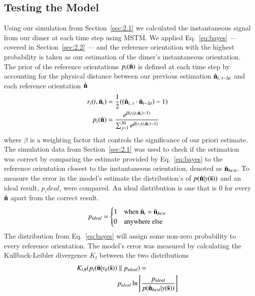 \documentclass[final, 3p]{elsarticle}
\begin{document}
\subsection{Testing the Model}
\label{sec:2.3}


Using our simulation from Section~\ref{sec:2.1} we calculated the
instantaneous signal from our dimer at each time step using MSTM.  We
applied Eq.~\eqref{eq:bayes} --- covered in Section~\ref{sec:2.2} ---
and the reference orientation with the highest probability is taken as
our estimation of the dimer's instantaneous orientation.  The prior of
the reference orientations $p_i(\hat{\bf n})$ is defined at each time
step by accounting for the physical distance between our previous
estimation $\hat{\bf n}_{i, \ t - \Delta t}$ and each reference
orientation $\hat{\bf n}$
\begin{align}
  r_i(t, \hat{\bf n}_i)
  &= \frac{1}{2}((\hat{\bf n}_{i,\ t} \cdot \hat{\bf n}_{t-\Delta t})-1)
  \\
  p_i(\hat{\bf n})
  &= \frac{e^{\beta (r_i(t,\hat{\bf n}_i)-1)}}
{\sum_{j=1}^{30}e^{\beta(r_j(t, \hat{\bf n}_i)-1)}}
\end{align}
where $\beta$ is a weighting factor that controls the significance of
our priori estimate.  The simulation data from Section~\ref{sec:2.1}
was used to check if the estimation was correct by comparing the
estimate provided by Eq.~\eqref{eq:bayes} to the reference orientation
closest to the instantaneous orientation, denoted as
$\hat{\bf n}_{best}$.  To measure the error in the model's estimate
the distribution's of $p(\hat{\bf n}| y(\bar{\bf s}))$ and an
ideal result, $p_ideal$, were compared.  An ideal distribution is one
that is 0 for every $\hat{\bf n}$ apart from the correct result.
\begin{align}
p_{ideal} = 
\begin{cases}
	1 & \text{when $\hat{\bf n}_i$ = $\hat{\bf n}_{best}$}\\
	0 & \text{anywhere else}
\end{cases}
\end{align}
The distribution from Eq.~\eqref{eq:bayes} will assign some non-zero
probability to every reference orientation.  The model's error was
measured by calculating the Kullback-Leibler divergence $K_l$ between
the two distributions
\begin{align}
  K_{l, \#}(p_i(\hat{\bf n}| y_k(\bar{\bf s})) &\parallel p_{ideal}) =\nonumber
  \\
&p_{ideal}\ln \left[\frac{p_{ideal}}{p(\hat{\bf n}_{best}| y(\bar{\bf s}))}
\right]
\end{align}
\end{document}
